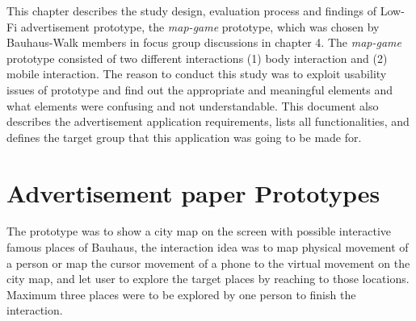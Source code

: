 This chapter describes the study design, evaluation process and findings of Low-Fi advertisement prototype, the \emph{map-game} prototype, which was chosen by Bauhaus-Walk members in focus group discussions in chapter 4. The \emph{map-game} prototype consisted of two different interactions (1) body interaction and (2) mobile interaction. The reason to conduct this study was to exploit usability issues of prototype and find out the appropriate and meaningful elements and what elements were confusing and not understandable. This document also describes the advertisement application requirements, lists all functionalities, and defines the target group that this application was going to be made for. 



\section{Advertisement paper Prototypes}
The prototype was to show a city map on the screen with possible interactive famous places of Bauhaus, the interaction idea was to map physical movement of a person or map the cursor movement of a phone to the virtual movement on the city map, and let user to explore the target places by reaching to those locations. Maximum three places were to be explored by one person to finish the interaction.

